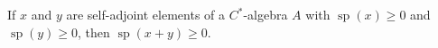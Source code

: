 If $x$ and $y$ are self-adjoint elements of a $C^*$-algebra $A$ with $\operatorname{sp}(x) \geqslant 0$ and $\operatorname{sp}(y) \geqslant 0$, then $\operatorname{sp}(x + y) \geqslant 0$.
